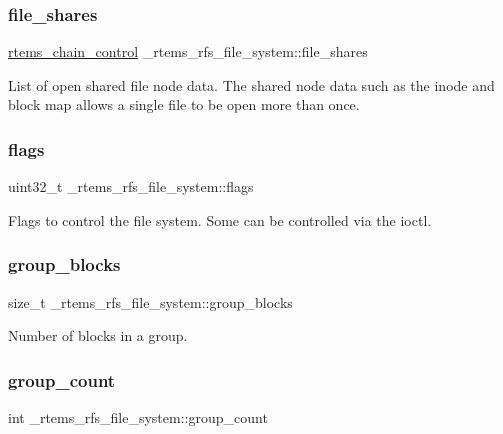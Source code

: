 \subsubsection{\texorpdfstring{file\_shares}{file\_shares}}
{\footnotesize\ttfamily \mbox{\hyperlink{unionChain__Control}{rtems\+\_\+chain\+\_\+control}} \+\_\+rtems\+\_\+rfs\+\_\+file\+\_\+system\+::file\+\_\+shares}

List of open shared file node data. The shared node data such as the inode and block map allows a single file to be open more than once. \mbox{\label{struct__rtems__rfs__file__system_a91f65ae14787a7fe852b91118f732d35}} 
\subsubsection{\texorpdfstring{flags}{flags}}
{\footnotesize\ttfamily uint32\+\_\+t \+\_\+rtems\+\_\+rfs\+\_\+file\+\_\+system\+::flags}

Flags to control the file system. Some can be controlled via the ioctl. \mbox{\label{struct__rtems__rfs__file__system_a99f2245081523d8d3254b554b1bc995d}} 
\subsubsection{\texorpdfstring{group\_blocks}{group\_blocks}}
{\footnotesize\ttfamily size\+\_\+t \+\_\+rtems\+\_\+rfs\+\_\+file\+\_\+system\+::group\+\_\+blocks}

Number of blocks in a group. \mbox{\label{struct__rtems__rfs__file__system_aad9bb4ef4afc6d1d36015d39481b70b9}} 
\subsubsection{\texorpdfstring{group\_count}{group\_count}}
{\footnotesize\ttfamily int \+\_\+rtems\+\_\+rfs\+\_\+file\+\_\+system\+::group\+\_\+count}

